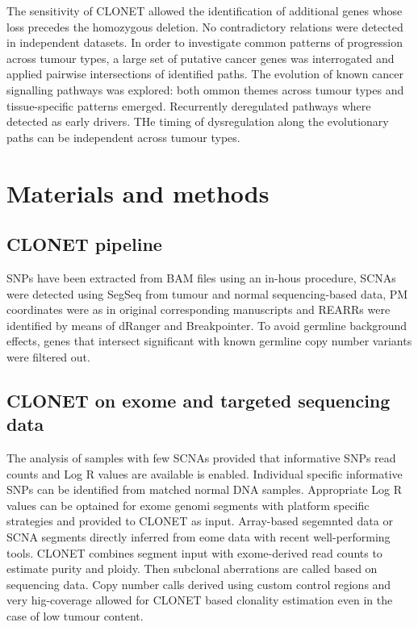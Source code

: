 	The sensitivity of CLONET allowed the identification of additional genes whose loss precedes the homozygous deletion.
	No contradictory relations were detected in independent datasets.
	In order to investigate common patterns of progression across tumour types, a large set of putative cancer genes was interrogated and applied pairwise intersections of identified paths.
	The evolution of known cancer signalling pathways was explored: both ommon themes across tumour types and tissue-specific patterns emerged.
	Recurrently deregulated pathways where detected as early drivers.
	THe timing of dysregulation along the evolutionary paths can be independent across tumour types.

\section{Materials and methods}

	\subsection{CLONET pipeline}
	SNPs have been extracted from BAM files using an in-hous procedure, SCNAs were detected using SegSeq from tumour and normal sequencing-based data, PM coordinates were as in original corresponding manuscripts and REARRs were identified by means of dRanger and Breakpointer.
	To avoid germline background effects, genes that intersect significant with known germline copy number variants were filtered out.

	\subsection{CLONET on exome and targeted sequencing data}
	The analysis of samples with few SCNAs provided that informative SNPs read counts and Log R values are available is enabled.
	Individual specific informative SNPs can be identified from matched normal DNA samples.
	Appropriate Log R values can be optained for exome genomi segments with platform specific strategies and provided to CLONET as input.
	Array-based segemnted data or SCNA segments directly inferred from eome data with recent well-performing tools.
	CLONET combines segment input with exome-derived read counts to estimate purity and ploidy.
	Then subclonal aberrations are called based on sequencing data.
	Copy number calls derived using custom control regions and very hig-coverage allowed for CLONET based clonality estimation even in the case of low tumour content.

